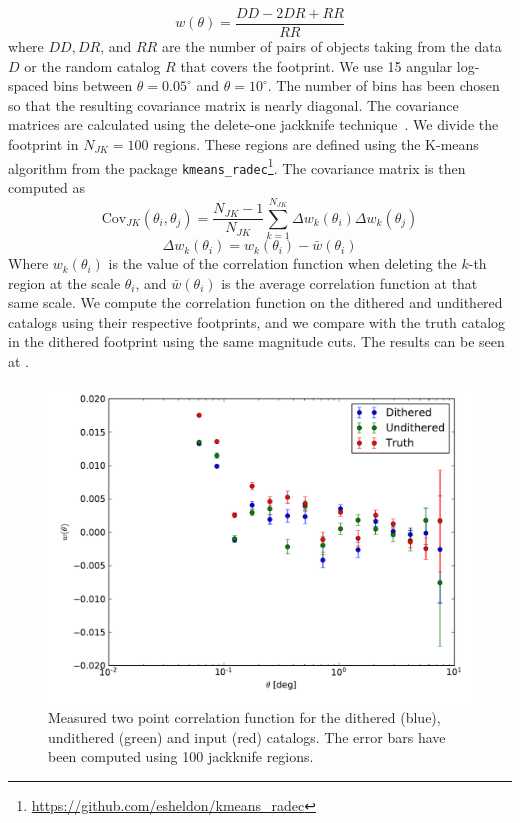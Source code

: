 \documentclass[\docopts]{\docclass}
\begin{document}
\begin{equation}
w(\theta) = \frac{DD - 2 DR + RR}{RR}
\end{equation} 
where $DD, DR$, and $RR$ are the number of pairs of objects taking from the data $D$ or the random catalog $R$ that covers the footprint. We use 15 angular log-spaced bins between $\theta=0.05^{\circ}$ and $\theta=10^{\circ}$. The number of bins has been chosen so that the resulting covariance matrix is nearly diagonal. The covariance matrices are calculated using the delete-one jackknife technique~\citep{Shao:1986:DJB,2009MNRAS.396...19N}. We divide the footprint in $N_{JK}=100$ regions. These regions are defined using the K-means algorithm from the package \texttt{kmeans\_radec}\footnote{\url{https://github.com/esheldon/kmeans\_radec}}. The covariance matrix is then computed as
\begin{equation}
\mathrm{Cov}_{JK}(\theta_{i},\theta_{j})=\frac{N_{JK}-1}{N_{JK}}\sum_{k=1}^{N_{JK}}\Delta w_{k}(\theta_{i}) \Delta w_{k}(\theta_{j})
\end{equation}
\begin{equation}
\Delta w_{k}(\theta_{i}) = w_{k}(\theta_{i})-\bar{w}(\theta_{i})
\end{equation}
Where $w_{k}(\theta_{i})$ is the value of the correlation function when deleting the $k$-th region at the scale $\theta_{i}$, and $\bar{w}(\theta_{i})$ is the average correlation function at that same scale. We compute the correlation function on the dithered and undithered catalogs using their respective footprints, and we compare with the truth catalog in the dithered footprint using the same magnitude cuts. The results can be seen at .
\begin{figure}
\includegraphics[width=0.9\columnwidth]{w_comp_25p3.pdf}
\caption{Measured two point correlation function for the dithered (blue), undithered (green) and input (red) catalogs. The error bars have been computed using 100 jackknife regions.}
\label{fig:2pt_corr}
\end{figure}
\end{document}
